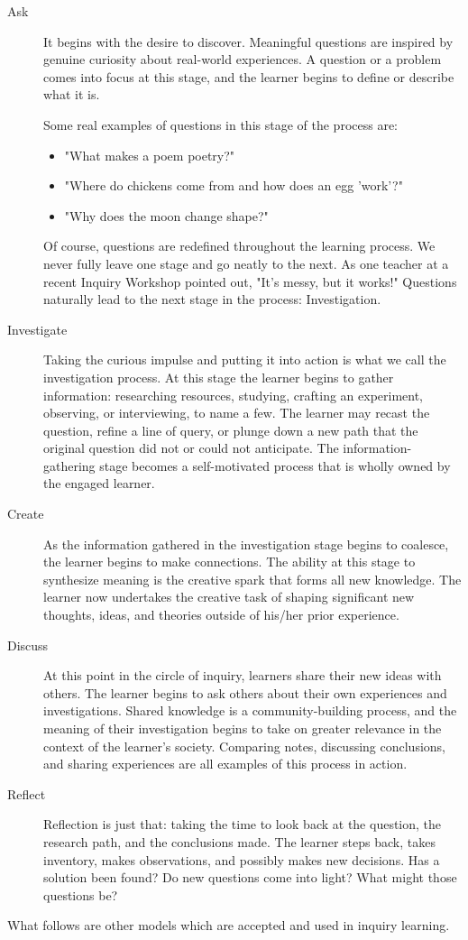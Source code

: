 \begin{description}
\item[Ask] It begins with the desire to discover. Meaningful questions are inspired
by genuine curiosity about real-world experiences. A question or a
problem comes into focus at this stage, and the learner begins to define
or describe what it is.

Some real examples of questions in this stage of the process are:
	\begin{itemize}
	\item "What makes a poem poetry?"
	\item "Where do chickens come from and how does an egg 'work'?"
	\item "Why does the moon change shape?"
	\end{itemize}
Of course, questions are redefined throughout the learning process. We
never fully leave one stage and go neatly to the next. As one teacher at a
recent Inquiry Workshop pointed out, "It's messy, but it works!"
Questions naturally lead to the next stage in the process: Investigation.
\item[Investigate] Taking the curious impulse and putting it into action is what we call the
investigation process. At this stage the learner begins to gather
information: researching resources, studying, crafting an experiment,
observing, or interviewing, to name a few. The learner may recast the
question, refine a line of query, or plunge down a new path that the
original question did not or could not anticipate. The information-
gathering stage becomes a self-motivated process that is wholly owned
by the engaged learner.
\item[Create] As the information gathered in the investigation stage begins to
coalesce, the learner begins to make connections. The ability at this
stage to synthesize meaning is the creative spark that forms all new
knowledge. The learner now undertakes the creative task of shaping
significant new thoughts, ideas, and theories outside of his/her prior
experience.
\item[Discuss] At this point in the circle of inquiry, learners share their new ideas with
others. The learner begins to ask others about their own experiences
and investigations. Shared knowledge is a community-building process,
and the meaning of their investigation begins to take on greater
relevance in the context of the learner's society. Comparing notes,
discussing conclusions, and sharing experiences are all examples of this
process in action.
\item[Reflect] Reflection is just that: taking the time to look back at the question, the
research path, and the conclusions made. The learner steps back, takes
inventory, makes observations, and possibly makes new decisions. Has a
solution been found? Do new questions come into light? What might
those questions be?
\end{description}
What follows are other models which are accepted and used in inquiry learning.
